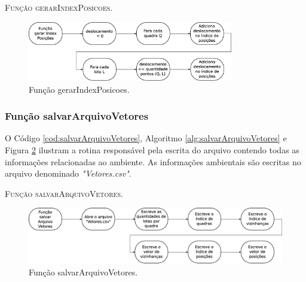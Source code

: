 

\begin{algorithm}[H]
   \SetAlgoLined   
   
   \caption{\textsc{Função gerarIndexPosicoes.}}
   \label{alg:gerarIndexPosicoes}
\end{algorithm}

\begin{figure}[H]
  \centering
  \includegraphics[width=0.8\textwidth]{Figuras/Simula/Fluxos/gerarIndexPosicoes.eps}
  \caption{Função gerarIndexPosicoes.}
  \label{fig:gerarIndexPosicoes}
\end{figure} 

\newpage

\subsubsection{Função salvarArquivoVetores}

O Código \ref{cod:salvarArquivoVetores}, Algoritmo \ref{alg:salvarArquivoVetores} e Figura \ref{fig:salvarArquivoVetores} ilustram a rotina responsável pela escrita do arquivo contendo todas as informações relacionadas ao ambiente. As informações ambientais são escritas no arquivo denominado \textit{"Vetores.csv"}.



\newpage

\begin{algorithm}[H]
   \SetAlgoLined   
   
   \caption{\textsc{Função salvarArquivoVetores.}}
   \label{alg:salvarArquivoVetores}
\end{algorithm}

\begin{figure}[H]
  \centering
  \includegraphics[width=1\textwidth]{Figuras/Simula/Fluxos/salvarArquivoVetores.eps}
  \caption{Função salvarArquivoVetores.}
  \label{fig:salvarArquivoVetores}
\end{figure} 

